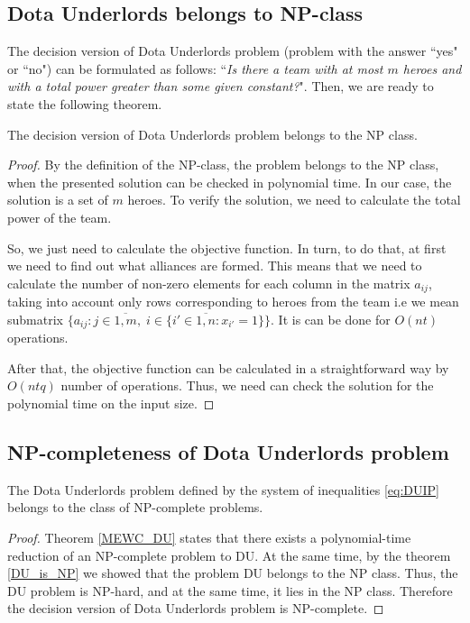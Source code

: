 \documentclass[smallextended]{svjour3}       %
\begin{document}
\subsection{Dota Underlords belongs to NP-class}
The decision version of Dota Underlords problem (problem with the answer ``yes" or ``no") can be formulated as follows: ``\textit{Is there a team with at most $ m $ heroes and with a total power greater than some given constant?}". Then, we are ready to state the following theorem.
\begin{theorem}
\label{DU_is_NP}
The decision version of Dota Underlords problem belongs to the  NP class.
\end{theorem}
\begin{proof}

By the definition of the NP-class, the problem belongs to the NP class, when the presented solution can be checked in polynomial time. In our case, the solution is a set of $m$ heroes. To verify the solution, we need to calculate the total power of the team. 

So, we just need to calculate the objective function. In turn, to do that, at first we need to find out what alliances are formed. This means that we need to calculate the number of non-zero elements for each column in the matrix $a_{ij}$, taking into account only rows corresponding to heroes from the team i.e  we mean submatrix $\{a_{ij}:  j \in \overline{1,m},\; i \in \{  i' \in \overline{1,n} :   x_{i'} = 1 \}  \}$. It is can be done for $O(nt)$ operations. 

After that, the objective function can be calculated in a straightforward way by $O(ntq)$ number of operations. Thus, we need can check the solution for the polynomial time on the input size. 
\end{proof}

\subsection{NP-completeness of Dota Underlords problem}
\begin{theorem}
	The Dota Underlords problem defined by the system of inequalities \eqref{eq:DUIP}  belongs to the class of NP-complete problems.
\end{theorem}

\begin{proof}
Theorem \ref{MEWC_DU} states that there exists a polynomial-time reduction of an NP-complete problem to DU. At the same time, by the theorem \ref{DU_is_NP} we showed that the problem DU belongs to the NP class. Thus, the DU problem is NP-hard, and at the same time, it lies in the NP class. Therefore the decision version of Dota Underlords problem is NP-complete.	
\end{proof}
\end{document}
